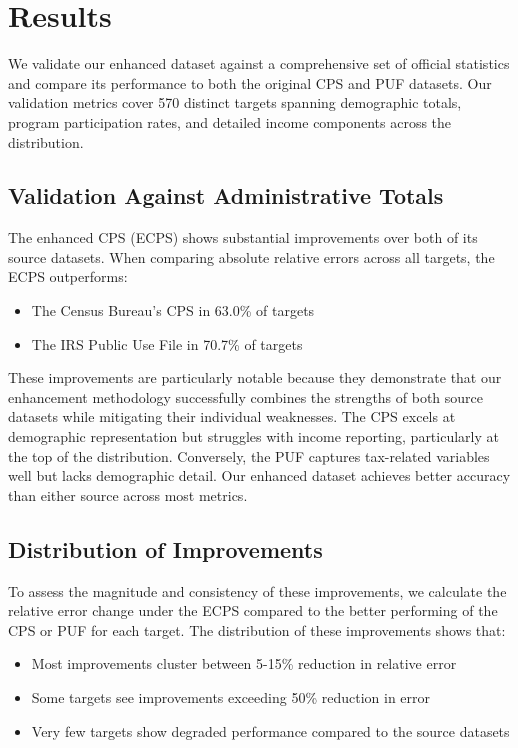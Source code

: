 \section{Results}

We validate our enhanced dataset against a comprehensive set of official statistics and compare its performance to both the original CPS and PUF datasets. Our validation metrics cover 570 distinct targets spanning demographic totals, program participation rates, and detailed income components across the distribution.

\subsection{Validation Against Administrative Totals}

The enhanced CPS (ECPS) shows substantial improvements over both of its source datasets. When comparing absolute relative errors across all targets, the ECPS outperforms:
\begin{itemize}
    \item The Census Bureau's CPS in 63.0\% of targets
    \item The IRS Public Use File in 70.7\% of targets
\end{itemize}

These improvements are particularly notable because they demonstrate that our enhancement methodology successfully combines the strengths of both source datasets while mitigating their individual weaknesses. The CPS excels at demographic representation but struggles with income reporting, particularly at the top of the distribution. Conversely, the PUF captures tax-related variables well but lacks demographic detail. Our enhanced dataset achieves better accuracy than either source across most metrics.

\subsection{Distribution of Improvements}

To assess the magnitude and consistency of these improvements, we calculate the relative error change under the ECPS compared to the better performing of the CPS or PUF for each target. The distribution of these improvements shows that:

\begin{itemize}
    \item Most improvements cluster between 5-15\% reduction in relative error
    \item Some targets see improvements exceeding 50\% reduction in error
    \item Very few targets show degraded performance compared to the source datasets
\end{itemize}

